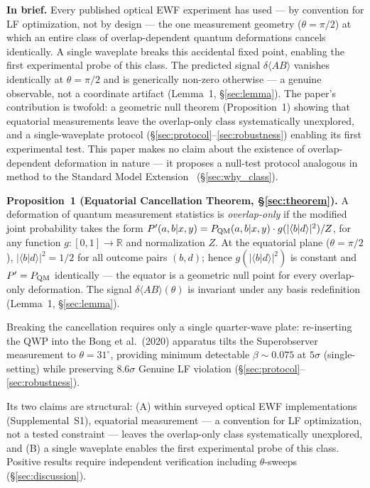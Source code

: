 \documentclass[twocolumn,aps,pra,superscriptaddress,floatfix,10pt]{revtex4-2}
\begin{document}
\textbf{In brief.} Every published optical EWF experiment has used --- by convention
for LF optimization, not by design --- the one measurement geometry ($\theta = \pi/2$)
at which an entire class of overlap-dependent quantum deformations cancels
identically. A single waveplate breaks this accidental fixed point, enabling
the first experimental probe of this class. The predicted signal
$\delta\langle AB\rangle$ vanishes identically at $\theta = \pi/2$ and is generically non-zero
otherwise --- a genuine observable, not a coordinate artifact
(Lemma~1, \S\ref{sec:lemma}). The paper's contribution is twofold: a geometric null
theorem (Proposition~1) showing that equatorial measurements leave the
overlap-only class systematically unexplored, and a single-waveplate
protocol (\S\ref{sec:protocol}--\ref{sec:robustness}) enabling its first experimental test. This paper makes no
claim about the existence of overlap-dependent deformation in nature --- it
proposes a null-test protocol analogous in method to the Standard Model
Extension~\cite{Colladay1997} (\S\ref{sec:why_class}).

\textbf{Proposition~1 (Equatorial Cancellation Theorem, \S\ref{sec:theorem}).} A deformation
of quantum measurement statistics is \emph{overlap-only} if the modified joint
probability takes the form $P'(a,b|x,y) = P_{\rm QM}(a,b|x,y) \cdot g(|\langle b|d\rangle|^2) / Z$,
for any function $g: [0,1] \to \mathbb{R}$ and normalization $Z$. At the equatorial
plane ($\theta = \pi/2$), $|\langle b|d\rangle|^2 = 1/2$ for all outcome pairs $(b,d)$; hence
$g(|\langle b|d\rangle|^2)$ is constant and $P' = P_{\rm QM}$ identically --- the equator is a
geometric null point for every overlap-only deformation. The signal
$\delta\langle AB\rangle(\theta)$ is invariant under any basis redefinition (Lemma~1, \S\ref{sec:lemma}).

Breaking the cancellation requires only a single quarter-wave plate:
re-inserting the QWP into the Bong et al.\ (2020) apparatus tilts the
Superobserver measurement to $\theta = 31^\circ$, providing minimum detectable
$\beta \sim 0.075$ at $5\sigma$ (single-setting) while preserving $8.6\sigma$ Genuine LF
violation (\S\ref{sec:protocol}--\ref{sec:robustness}).

Its two claims are structural: (A) within surveyed optical EWF
implementations (Supplemental~S1), equatorial measurement --- a convention
for LF optimization, not a tested constraint --- leaves the overlap-only
class systematically unexplored, and (B) a single waveplate enables the
first experimental probe of this class. Positive results require
independent verification including $\theta$-sweeps (\S\ref{sec:discussion}).
\end{document}
